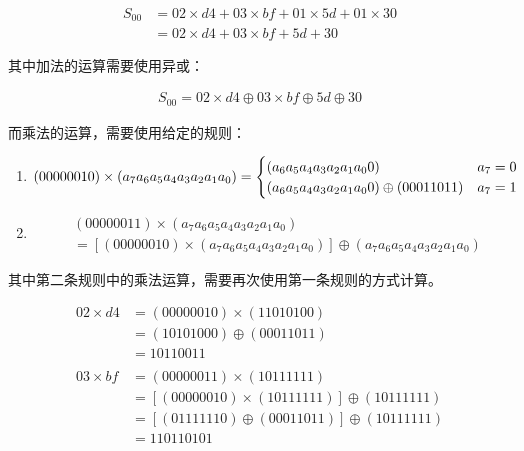 \begin{align*}
    S_{00} & = 02 \times d4 + 03 \times bf + 01 \times 5d + 01 \times 30 \\
           & = 02 \times d4 + 03 \times bf + 5d + 30
\end{align*}

其中加法的运算需要使用异或：

\vspace{-1cm}

\begin{align*}
    S_{00} = 02 \times d4 \oplus 03 \times bf \oplus 5d \oplus 30
\end{align*}

而乘法的运算，需要使用给定的规则：

\begin{enumerate}
    \item \begin{equation*}
              (00000010) \times (a_7a_6a_5a_4a_3a_2a_1a_0) =
              \begin{cases}
                  (a_6a_5a_4a_3a_2a_1a_00)                   & \text{$ a_7 = 0 $} \\
                  (a_6a_5a_4a_3a_2a_1a_00) \oplus (00011011) & \text{$ a_7 = 1 $}
              \end{cases}
          \end{equation*}

    \item \begin{align*}
               & (00000011) \times (a_7a_6a_5a_4a_3a_2a_1a_0)                                                  \\
               & = \left[(00000010) \times (a_7a_6a_5a_4a_3a_2a_1a_0)\right] \oplus (a_7a_6a_5a_4a_3a_2a_1a_0)
          \end{align*}
\end{enumerate}

其中第二条规则中的乘法运算，需要再次使用第一条规则的方式计算。

\vspace{-1cm}

\begin{align*}
    02 \times d4 & = (00000010) \times (11010100)                                \\
                 & = (10101000) \oplus (00011011)                                \\
                 & = 10110011                                                    \\
    \\
    03 \times bf & = (00000011) \times (10111111)                                \\
                 & = \left[(00000010) \times (10111111)\right] \oplus (10111111) \\
                 & = \left[(01111110) \oplus (00011011)\right] \oplus (10111111) \\
                 & = 110110101
\end{align*}

